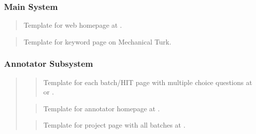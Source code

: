 \documentclass[a4paper,12pt,english]{sphinxmanual}
\begin{document}
\subsubsection{Main System}
\label{\detokenize{templates:main-system}}
\begin{quote}

Template for web homepage at  \sphinxcode{\sphinxupquote{/}}.
\end{quote}

\begin{quote}

Template for keyword page on Mechanical Turk.
\end{quote}


\subsubsection{Annotator Subsystem}
\label{\detokenize{templates:annotator-subsystem}}\begin{quote}

\begin{quote}

Template for each batch/HIT page with multiple choice questions at  or .
\end{quote}

\begin{quote}

Template for annotator homepage at .
\end{quote}

\begin{quote}

Template for project page with all batches at .
\end{quote}
\end{quote}
\end{document}
